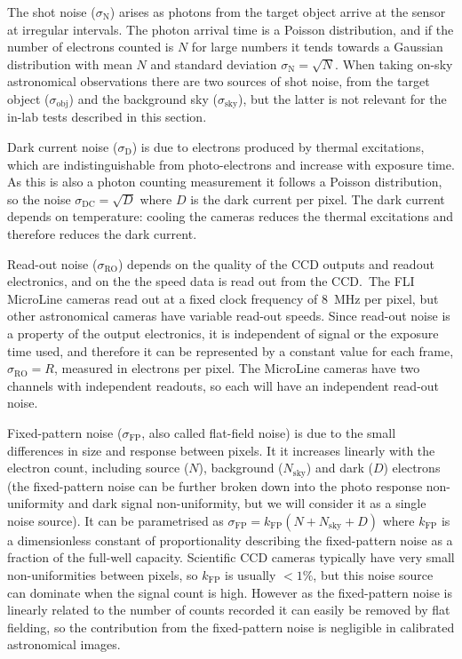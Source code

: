 \begin{colsection}
\begin{colsection}
The shot noise ($\sigma_\text{N}$) arises as photons from the target object arrive at the sensor at irregular intervals. The photon arrival time is a Poisson distribution, and if the number of electrons counted is $N$ for large numbers it tends towards a Gaussian distribution with mean $N$ and standard deviation $\sigma_\text{N} = \sqrt{N}$. When taking on-sky astronomical observations there are two sources of shot noise, from the target object ($\sigma_\text{obj}$) and the background sky ($\sigma_\text{sky}$), but the latter is not relevant for the in-lab tests described in this section.

Dark current noise ($\sigma_\text{D}$) is due to electrons produced by thermal excitations, which are indistinguishable from photo-electrons and increase with exposure time. As this is also a photon counting measurement it follows a Poisson distribution, so the noise $\sigma_\text{DC} = \sqrt{D}$ where $D$ is the dark current per pixel. The dark current depends on temperature: cooling the cameras reduces the thermal excitations and therefore reduces the dark current.

Read-out noise ($\sigma_\text{RO}$) depends on the quality of the CCD outputs and readout electronics, and on the the speed data is read out from the CCD.\ The FLI MicroLine cameras read out at a fixed clock frequency of \SI{8}{\mega\hertz} per pixel, but other astronomical cameras have variable read-out speeds. Since read-out noise is a property of the output electronics, it is independent of signal or the exposure time used, and therefore it can be represented by a constant value for each frame, $\sigma_\text{RO} = R$, measured in electrons per pixel. The MicroLine cameras have two channels with independent readouts, so each will have an independent read-out noise.

Fixed-pattern noise ($\sigma_\text{FP}$, also called flat-field noise) is due to the small differences in size and response between pixels. It it increases linearly with the electron count, including source ($N$), background ($N_\text{sky}$) and dark ($D$) electrons (the fixed-pattern noise can be further broken down into the photo response non-uniformity and dark signal non-uniformity, but we will consider it as a single noise source). It can be parametrised as $\sigma_\text{FP} = k_\text{FP}(N+N_\text{sky}+D)$ where $k_\text{FP}$ is a dimensionless constant of proportionality describing the fixed-pattern noise as a fraction of the full-well capacity. Scientific CCD cameras typically have very small non-uniformities between pixels, so $k_\text{FP}$ is usually $<1\%$, but this noise source can dominate when the signal count is high. However as the fixed-pattern noise is linearly related to the number of counts recorded  it can easily be removed by flat fielding, so the contribution from the fixed-pattern noise is negligible in calibrated astronomical images.


\end{colsection}
\end{colsection}
